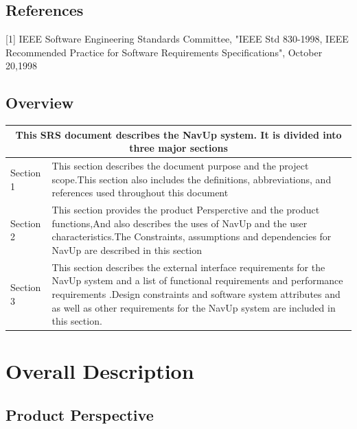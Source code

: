 \documentclass[english]{article}
\begin{document}
		\subsection{References}
			[1] IEEE Software Engineering Standards Committee, "IEEE Std 830-1998, IEEE Recommended Practice for Software Requirements Specifications", October 20,1998

		\subsection{Overview}
				\begin{tabular}{ |p{3cm}||p{11cm}|  }
				\hline
				\multicolumn{2}{|c|}{This SRS document describes the NavUp system. It is divided into three major sections} \\
				\hline
				Section 1 & This section describes the document purpose and the project scope.This section also includes the definitions, abbreviations, and references used throughout this document \\
				\hline
				Section 2 & This section provides the product Persperctive and the product functions,And also describes the uses of NavUp and the user characteristics.The Constraints, assumptions and dependencies for NavUp are described in this section\\
				\hline
				Section 3 & This section describes the external interface requirements for the NavUp system and a list of functional requirements and performance requirements .Design constraints and software system attributes and as well as other requirements for the NavUp system are included in this section.\\
				\hline
				\end{tabular}
	\newpage
	\section{Overall Description}
		
		\subsection{Product Perspective}
			
\end{document}
